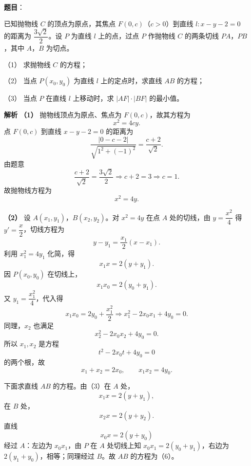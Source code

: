 \begin{answer}



\end{answer}
\begin{answer}

\textbf{题目}：

已知抛物线 $C$ 的顶点为原点，其焦点 $F(0,c)$（$c>0$）到直线 $l:x-y-2=0$ 的距离为 $\dfrac{3\sqrt2}{2}$。设 $P$ 为直线 $l$ 上的点，过点 $P$ 作抛物线 $C$ 的两条切线 $PA$，$PB$，其中 $A$，$B$ 为切点。

（1） 求抛物线 $C$ 的方程；

（2） 当点 $P(x_0,y_0)$ 为直线 $l$ 上的定点时，求直线 $AB$ 的方程；

（3） 当点 $P$ 在直线 $l$ 上移动时，求 $|AF|\cdot|BF|$ 的最小值。

\textbf{解析}
\textbf{（1）}
抛物线顶点为原点、焦点为 $F(0,c)$，故其方程为
\nopagebreak[4]
\[x^2=4cy.\]
点 $F(0,c)$ 到直线 $x-y-2=0$ 的距离为
\nopagebreak[4]
\[\frac{|0-c-2|}{\sqrt{1^2+(-1)^2}}=\frac{c+2}{\sqrt2}.\]
由题意
\nopagebreak[4]
\[\frac{c+2}{\sqrt2}=\frac{3\sqrt2}{2}
\Longrightarrow c+2=3
\Longrightarrow c=1.\]
故抛物线方程为
\nopagebreak[4]
\[x^2=4y.\]

\textbf{（2）}
设 $A(x_1,y_1)$，$B(x_2,y_2)$。对 $x^2=4y$ 在点 $A$ 处的切线，由 $y=\dfrac{x^2}{4}$ 得 $y'=\dfrac x2$，切线方程为
\nopagebreak[4]
\[y-y_1=\frac{x_1}{2}(x-x_1).\]
利用 $x_1^2=4y_1$ 化简，得
\nopagebreak[4]
\[x_1x=2(y+y_1). \tag{3}\]
因 $P(x_0,y_0)$ 在切线上，
\nopagebreak[4]
\[x_1x_0=2(y_0+y_1).\]
又 $y_1=\dfrac{x_1^2}{4}$，代入得
\nopagebreak[4]
\[x_1x_0=2y_0+\frac{x_1^2}{2}
\Longrightarrow x_1^2-2x_0x_1+4y_0=0. \tag{4}\]
同理，$x_2$ 也满足
\nopagebreak[4]
\[x_2^2-2x_0x_2+4y_0=0.\]
所以 $x_1,x_2$ 是方程
\nopagebreak[4]
\[t^2-2x_0t+4y_0=0\]
的两个根，故
\nopagebreak[4]
\[x_1+x_2=2x_0,\qquad x_1x_2=4y_0. \tag{5}\]

下面求直线 $AB$ 的方程。由（3）在 $A$ 处，
\nopagebreak[4]
\[x_1x=2(y+y_1),\]
在 $B$ 处，
\nopagebreak[4]
\[x_2x=2(y+y_2).\]
直线
\nopagebreak[4]
\[x_0x=2(y+y_0) \tag{6}\]
经过 $A$：左边为 $x_0x_1$，由 $P$ 在 $A$ 处切线上知 $x_0x_1=2(y_0+y_1)$，右边为 $2(y_1+y_0)$，相等；同理经过 $B$。故 $AB$ 的方程为（6）。


\end{answer}
